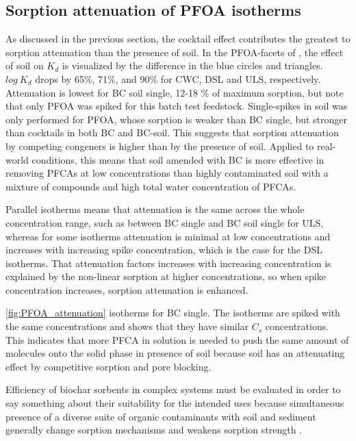 \subsection{Sorption attenuation of PFOA isotherms}
As discussed in the previous section, the cocktail effect contributes the greatest to sorption attenuation than the presence of soil. In the PFOA-facets of , the effect of soil on $K_d$ is visualized by the difference in the blue circles and triangles. $log~K_d$ drops by 65\%, 71\%, and 90\% for CWC, DSL and ULS, respectively. 
Attenuation is lowest for BC soil single, 12-18 \% of maximum sorption, but note that only PFOA was spiked for this batch test feedstock. Single-spikes in soil was only performed for PFOA, whose sorption is weaker than BC single, but stronger than cocktails in both BC and BC-soil. This suggests that sorption attenuation by competing congeners is higher than by the presence of soil. Applied to real-world conditions, this means that soil amended with BC is more effective in removing PFCAs at low concentrations than highly contaminated soil with a mixture of compounds and high total water concentration of PFCAs.

Parallel isotherms means that attenuation is the same across the whole concentration range, such as between BC single and BC soil single for ULS, whereas for some isotherms attenuation is minimal at low concentrations and increases with increasing spike concentration, which is the case for the DSL isotherms. That attenuation factors increases with increasing concentration is explained by the non-linear sorption at higher concentrations, so when spike concentration increases, sorption attenuation is enhanced.   

\cref{fig:PFOA_attenuation} isotherms for BC single. The isotherms are spiked with the same concentrations and shows that they have similar $C_s$ concentrations. This indicates that more PFCA in solution is needed to push the same amount of molecules onto the solid phase in presence of soil because soil has an attenuating effect by competitive sorption and pore blocking. 

Efficiency of biochar sorbents in complex systems must be evaluated in order to say something about their suitability for the intended uses because simultaneous presence of a diverse suite of organic contaminants with soil and sediment generally change sorption mechanisms and weakens sorption strength \citep{zhou2010sorption}.

